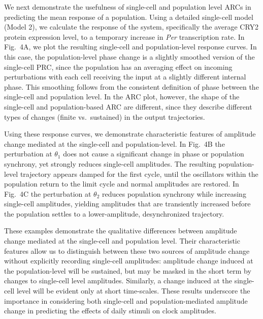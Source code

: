 \documentclass[11pt, letterpaper]{article}
\begin{document}
We next demonstrate the usefulness of single-cell and population level ARCs in predicting the mean response of a population.
Using a detailed single-cell model (Model 2), we calculate the response of the system, specifically the average CRY2 protein expression level, to a temporary increase in {\itshape Per} transcription rate.
In Fig.~4A, we plot the resulting single-cell and population-level response curves.
In this case, the population-level phase change is a slightly smoothed version of the single-cell PRC, since the population has an averaging effect on incoming perturbations with each cell receiving the input at a slightly different internal phase.
This smoothing follows from the consistent definition of phase between the single-cell and population level.
In the ARC plot, however, the shape of the single-cell and population-based ARC are different, since they describe different types of changes (finite vs.\ sustained) in the output trajectories.

Using these response curves, we demonstrate characteristic features of amplitude change mediated at the single-cell and population-level.
In Fig.~4B the perturbation at $\theta_1$ does not cause a significant change in phase or population synchrony, yet strongly reduces single-cell amplitudes.
The resulting population-level trajectory appears damped for the first cycle, until the oscillators within the population return to the limit cycle and normal amplitudes are restored.
In Fig.~4C the perturbation at $\theta_2$ reduces population synchrony while increasing single-cell amplitudes, yielding amplitudes that are transiently increased before the population settles to a lower-amplitude, desynchronized trajectory.

These examples demonstrate the qualitative differences between amplitude change mediated at the single-cell and population level.
Their characteristic features allow us to distinguish between these two sources of amplitude change without explicitly recording single-cell amplitudes: amplitude change induced at the population-level will be sustained, but may be masked in the short term by changes to single-cell level amplitudes.
Similarly, a change induced at the single-cell level will be evident only at short time-scales.
These results underscore the importance in considering both single-cell and population-mediated amplitude change in predicting the effects of daily stimuli on clock amplitudes.
\end{document}

